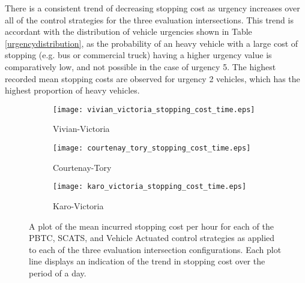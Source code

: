 There is a consistent trend of decreasing stopping cost as urgency increases over all of the control strategies for the three evaluation intersections. This trend is accordant with the distribution of vehicle urgencies shown in Table \ref{urgencydistribution}, as the probability of an heavy vehicle with a large cost of stopping (e.g. bus or commercial truck) having a higher urgency value is comparatively low, and not possible in the case of urgency 5. The highest recorded mean stopping costs are observed for urgency 2 vehicles, which has the highest proportion of heavy vehicles. 

\begin{figure}
\centering
\begin{subfigure}{.5\textwidth}
  \centering
  \texttt{[image: vivian\_victoria\_stopping\_cost\_time.eps]}
  \caption{Vivian-Victoria}
  \label{stopping_cost_time:sub1}
\end{subfigure}%
\begin{subfigure}{.5\textwidth}
  \centering
  \texttt{[image: courtenay\_tory\_stopping\_cost\_time.eps]}
  \caption{Courtenay-Tory}
  \label{stopping_cost_time:sub2}
\end{subfigure}

\vspace{1cm}

\begin{subfigure}{.5\textwidth}
  \centering
  \texttt{[image: karo\_victoria\_stopping\_cost\_time.eps]}
  \caption{Karo-Victoria}
  \label{stopping_cost_time:sub3}
\end{subfigure}%
\caption[Results of measuring the mean stopping cost per hour incurred for each evaluation control strategy and intersection.]{ A plot of the mean incurred stopping cost per hour for each of the PBTC, SCATS, and Vehicle Actuated control strategies as applied to each of the three evaluation intersection configurations. Each plot line displays an indication of the trend in stopping cost over the period of a day.  }
\label{eval:stopping_cost_time}
\end{figure}

